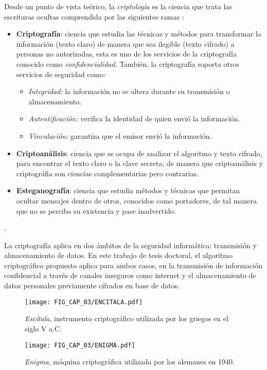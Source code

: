 Desde un punto de vista teórico, la \textit{criptología} es la ciencia que trata las escrituras ocultas comprendida por las siguientes ramas \cite{G_2006}: 
\begin{itemize}
\item \textbf{Criptografía}: ciencia que estudia las técnicas y métodos para transformar la información (texto claro) de manera que sea ilegible (texto cifrado) a personas no autorizadas, esta es uno de los servicios de la criptografía conocido como \textit{confidencialidad}. También, la criptografía soporta otros servicios de seguridad como:
\begin{itemize}
\item \textit{Integridad:} la información no se altera durante su transmisión o almacenamiento.
\item \textit{Autentificación:} verifica la identidad de quien envió la información.
\item \textit{Vinculación:} garantiza que el emisor envió la información.
\end{itemize}
\item \textbf{Criptoanálisis}: ciencia que se ocupa de analizar el algoritmo y texto cifrado, para encontrar el texto claro o la clave secreta; de manera que criptoanálisis y criptográfia son ciencias complementarias pero contrarias.
\item \textbf{Esteganografía}: ciencia que estudia métodos y técnicas que permitan ocultar mensajes dentro de otros, conocidos como portadores, de tal manera que no se perciba su existencia y pase inadvertido.  
\end{itemize}.

La criptografía aplica en dos ámbitos de la seguridad informática: transmisión y almacenamiento de datos.  En este trabajo de tesis doctoral, el algoritmo criptográfico propuesto aplica para ambos casos, en la transmisión de información confidencial a través de canales inseguros como internet y el almacenamiento de datos personales previamente cifrados en base de datos. 

\begin{figure}[!htbp] %
	\center
	\texttt{[image: FIG\_CAP\_03/ENCITALA.pdf]}    
	\caption{\textit{Escítala}, instrumento criptográfico utilizada por los griegos en el siglo V a.C.}
\end{figure}

\begin{figure}[!htbp] %
	\center
	\texttt{[image: FIG\_CAP\_03/ENIGMA.pdf]}    
	\caption{\textit{Enigma}, máquina criptográfica utilizada por los alemanes en 1940.}
\end{figure}

